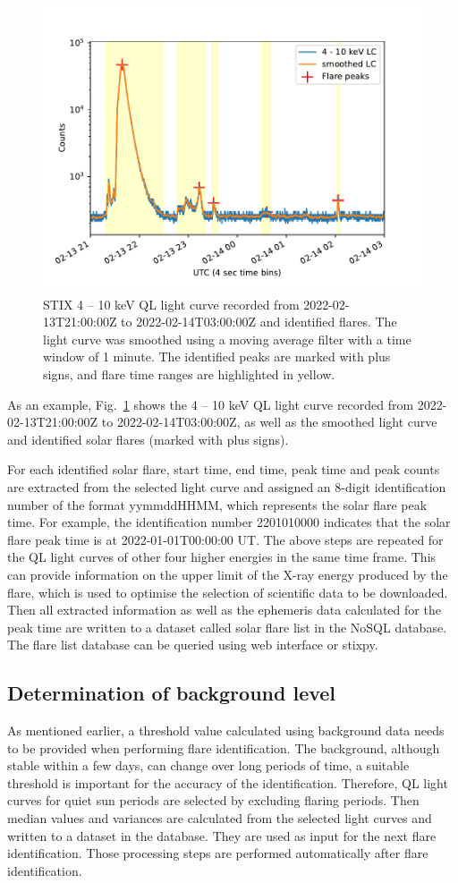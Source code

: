 \documentclass[referee]{aa} %
\begin{document}
\begin{figure}
  \centering
  \includegraphics[width=0.8\linewidth]{figures/flaredet.pdf}
  \caption{STIX 4 -- 10 keV QL light curve recorded from  2022-02-13T21:00:00Z to 2022-02-14T03:00:00Z and 
  identified flares.   The light curve was smoothed using a moving average filter with a time window
  of 1 minute. The identified peaks are marked with plus signs, and flare time ranges are highlighted in yellow.
  }
  \label{fig:flare-det}
\end{figure}
As an example, Fig.~\ref{fig:flare-det} shows  the 4 -- 10 keV QL  light curve recorded from 
2022-02-13T21:00:00Z to 2022-02-14T03:00:00Z, as well as the smoothed light curve and  identified solar flares (marked with plus signs).

For each identified solar flare,  start time, end time, peak time and peak 
counts are extracted from the selected light curve and assigned 
an 8-digit identification number of the format yymmddHHMM, which represents the solar flare peak time. 
For example, the identification number 2201010000  indicates that 
the solar flare peak time is at 2022-01-01T00:00:00 UT. 
The above steps are repeated  for the QL light curves of other four higher energies
in the same time frame. This can provide information on the upper limit of the X-ray energy produced by the flare,
which is used to optimise the selection of scientific data to be downloaded. 
Then all extracted information as well as the ephemeris data calculated for the peak time are 
written to a dataset called solar flare list in the NoSQL database.
The flare list database can be queried using web interface or stixpy.
\subsection{Determination of background level}
As mentioned earlier, a threshold value calculated using background data needs to be provided when
performing flare identification.  
The background, although stable within a few days, can change over long periods of time,
 a suitable threshold is important for the accuracy of the identification. 
 Therefore, QL light curves for  quiet sun periods are selected by excluding flaring periods. 
 Then median values and variances are calculated from the selected light curves and 
 written to a dataset in the database. They are used as input for the next flare identification. 
 Those processing steps are performed automatically after flare identification.
\end{document}
